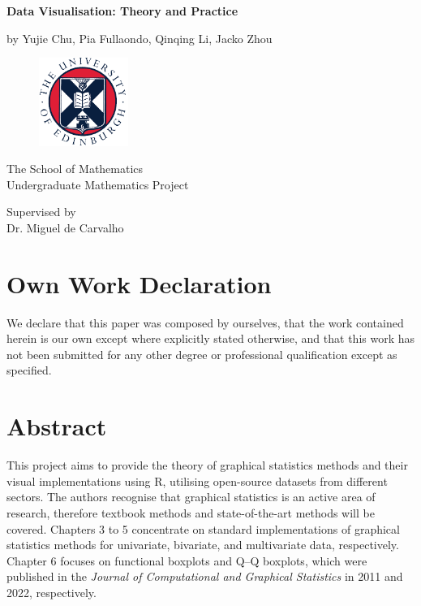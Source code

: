 \documentclass{article}\usepackage[]{graphicx}\usepackage[]{xcolor}
\numberwithin{equation}{section}
\begin{document}
\begin{center}
\textbf{\Huge Data Visualisation: Theory and Practice} \\
\vspace{0.5cm}

\LARGE by 
\vspace{0.25cm}
\LARGE Yujie Chu, Pia Fullaondo, Qinqing Li, Jacko Zhou \\
\vspace {2cm}

\begin{figure}[H]
    \centering
    \includegraphics[width=0.26\textwidth]{image_reference/UniversityLogo.png}
\end{figure}

\vspace {2cm}

The School of Mathematics \\
Undergraduate Mathematics Project
\vspace {0.25cm}

\vspace{2.5cm}

Supervised by \\
Dr. Miguel de Carvalho \\
\end{center}


\newpage
\section*{Own Work Declaration}

\noindent We declare that this paper was composed by ourselves, that the work contained herein is our own except where explicitly stated otherwise, and that this work has not been submitted for any other degree or professional qualification except as specified.

\newpage

\section*{Abstract}

\noindent
This project aims to provide the theory of graphical statistics methods and their visual implementations using R, utilising open-source datasets from different sectors. The authors recognise that graphical statistics is an active area of research, therefore textbook methods and state-of-the-art methods will be covered. Chapters 3 to 5 concentrate on standard implementations of graphical statistics methods for univariate, bivariate, and multivariate data, respectively. Chapter 6 focuses on functional boxplots and Q–Q boxplots, which were published in the \textit{Journal of Computational and Graphical Statistics} in 2011 and 2022, respectively.\\
\end{document}
